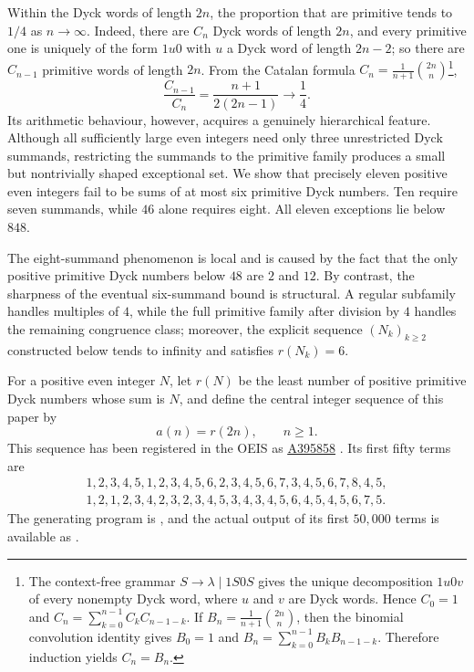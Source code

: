 \documentclass[12pt]{article}
\theoremstyle{plain}
\theoremstyle{definition}
\theoremstyle{plain}
\newcommand{\seqnum}[1]{\href{https://oeis.org/#1}{\rm \underline{#1}}}
\begin{document}
Within the Dyck words of length $2n$, the proportion that are primitive
tends to $1/4$ as $n\to\infty$.  Indeed, there are $C_n$ Dyck words of
length $2n$, and every primitive one is uniquely of the form $1u0$ with
$u$ a Dyck word of length $2n-2$; so there are $C_{n-1}$ primitive words
of length $2n$.  From the Catalan formula
$C_n=\frac1{n+1}\binom{2n}{n}$\footnote{The context-free grammar
$S\to\lambda\mid 1S0S$ gives the unique decomposition $1u0v$ of every
nonempty Dyck word, where $u$ and $v$ are Dyck words.  Hence $C_0=1$ and
$C_n=\sum_{k=0}^{n-1}C_kC_{n-1-k}$.  If
$B_n=\frac{1}{n+1}\binom{2n}{n}$, then the binomial convolution identity gives
$B_0=1$ and $B_n=\sum_{k=0}^{n-1}B_kB_{n-1-k}$.  Therefore induction yields
$C_n=B_n$.},
\[
 \frac{C_{n-1}}{C_n}=\frac{n+1}{2(2n-1)}\longrightarrow\frac14 .
\]
Its arithmetic behaviour, however, acquires a genuinely hierarchical
feature.  Although all sufficiently large even integers need only three
unrestricted Dyck summands, restricting the summands to the primitive family
produces a small but nontrivially shaped exceptional set.  We show that
precisely eleven positive even integers fail to be sums of at most six
primitive Dyck numbers.  Ten require seven summands, while $46$ alone
requires eight.  All eleven exceptions lie below $848$.

The eight-summand phenomenon is local and is caused by the fact that the only
positive primitive Dyck numbers below $48$ are $2$ and $12$.  By contrast,
the sharpness of the eventual six-summand bound is structural.  A regular
subfamily handles multiples of $4$, while the full primitive family after
division by $4$ handles the remaining congruence class; moreover, the
explicit sequence $(N_k)_{k\geq2}$ constructed below tends to infinity and
satisfies $r(N_k)=6$.

For a positive even integer $N$, let $r(N)$ be the least number of
positive primitive Dyck numbers whose sum is $N$, and define the central
integer sequence of this paper by
\[
        a(n)=r(2n),\qquad n\geq1.
\]
This sequence has been registered in the OEIS as
\seqnum{A395858} \cite{OEIS-A395858}.  Its first fifty terms are
\[
\begin{gathered}
1,2,3,4,5,1,2,3,4,5,6,2,3,4,5,6,7,3,4,5,6,7,8,4,5,\\
1,2,1,2,3,4,2,3,2,3,4,5,3,4,3,4,5,6,4,5,4,5,6,7,5.
\end{gathered}
\]
The generating program is
\href{https://github.com/growupkuriyama-hub/lean_cfg_project/blob/3525cfb/LeanCfgProject/PrimDyck/A395858.py}{},
and the actual output of its first $50{,}000$ terms is available as
\href{https://github.com/growupkuriyama-hub/lean_cfg_project/blob/3525cfb/LeanCfgProject/PrimDyck/b395858.txt}{}.
\end{document}
